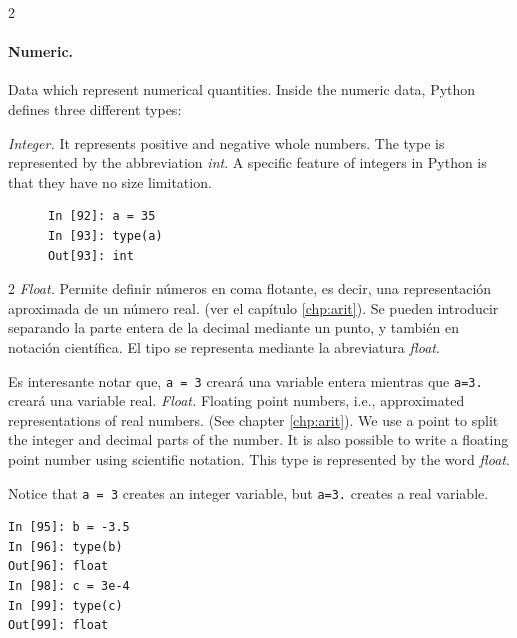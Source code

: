 \begin{paracol}{2}
\paragraph{Numeric.} Data which represent numerical quantities. Inside the numeric data, Python defines three different types:

\emph{Integer.} It represents positive and negative whole numbers. The type is represented by the abbreviation \emph{int}. A specific feature of integers in Python is that they have no size limitation.
\end{paracol}

\begin{figure}[thp]
\centering
\begin{minipage}{0.2\textwidth}
\begin{verbatim}
In [92]: a = 35
In [93]: type(a)
Out[93]: int
\end{verbatim}
\end{minipage}
\end{figure}
\begin{paracol}{2}   
\emph{Float.} Permite definir números en coma flotante, es decir, una representación aproximada de un número real. (ver el capítulo \ref{chp:arit}). Se pueden introducir separando la parte entera de la decimal mediante un punto, y también en notación científica. El tipo se representa mediante la abreviatura \emph{float}.

Es interesante notar que, \texttt{a = 3} creará una variable entera mientras que \texttt{a=3.} creará una variable real.
\switchcolumn
\emph{Float.} Floating point numbers, i.e., approximated representations of real numbers. (See chapter \ref{chp:arit}). We use a point to split the integer and decimal parts of the number. It is also possible to write a floating point number using scientific notation. This type is represented by the word \emph{float}.

Notice that \texttt{a = 3} creates an integer variable, but \texttt{a=3.} creates a real variable. 
\end{paracol}

\begin{center}
\begin{minipage}{0.2\textwidth}
\begin{verbatim}
In [95]: b = -3.5
In [96]: type(b)
Out[96]: float
In [98]: c = 3e-4
In [99]: type(c)
Out[99]: float
\end{verbatim}
\end{minipage}
\end{center}


